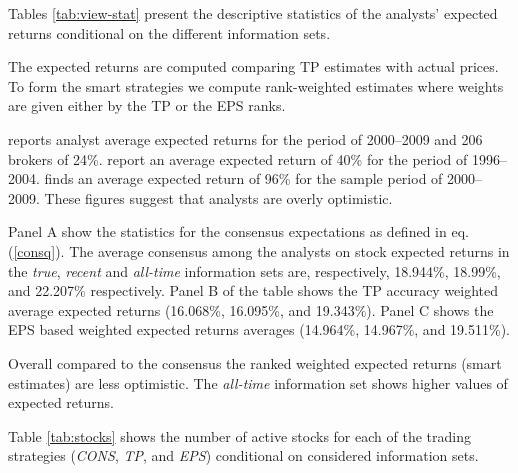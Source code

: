 \documentclass{article}\usepackage[]{graphicx}\usepackage[]{color}
\newcommand{\tr}{\textit{true}}
\newcommand{\naive}{\textit{recent}}
\newcommand{\default}{\textit{all-time}}
\begin{document}
Tables \ref{tab:view-stat} present the descriptive statistics of the analysts' expected returns conditional on the different information sets. 


The expected returns  are computed comparing TP estimates with actual prices. To form the smart strategies we compute rank-weighted estimates where weights are given either by the TP or the EPS ranks. 

\cite{bradshaw2002} reports analyst average expected returns for the period of 2000--2009 and 206 brokers of 24\%. \cite{da2011} report an average expected return of 40\% for the period of 1996--2004. \cite{zhou2013} finds an average expected return of 96\% for the sample period of 2000--2009. These figures suggest that analysts are overly optimistic.

Panel A show the statistics for the consensus expectations as defined in eq. (\ref{consq}). The average consensus among the analysts on stock expected returns in the  \tr{}, \naive{} and \default{} information sets are, respectively, 18.944\%, 18.99\%, and 22.207\% respectively. Panel B of the table shows the TP accuracy weighted average expected returns (16.068\%, 16.095\%, and 19.343\%). Panel C shows the EPS based weighted expected returns averages (14.964\%, 14.967\%, and 19.511\%). 

Overall compared to the consensus the ranked weighted expected returns (smart estimates) are less optimistic. The \default{} information set shows higher values of expected returns.

Table \ref{tab:stocks} shows the number of active stocks for each of the trading strategies (\textit{CONS}, \textit{TP}, and \textit{EPS}) conditional on considered information sets.
\end{document}
